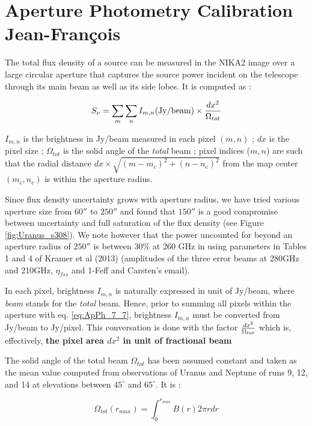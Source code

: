 \section{Aperture Photometry Calibration {\color{green} Jean-Fran\c cois}}

The total flux density of a source can be measured in the NIKA2 image over a large circular aperture that  
captures the source power incident on the telescope  through its main
beam as well as its side lobes. It is computed as :

\begin{equation}
S_{\nu} = \sum_{m} \sum_{n}  I_{m,n} ({\rm Jy/beam}) \times {dx^2 \over {\Omega_{tot}}}
\label{eq:ApPh_7_7}
\end{equation}

\noindent  $I_{m,n}$ is the brightness in Jy/beam measured in each pixel $(m,n)$  ; $dx$ is the pixel size ;
$\Omega_{tot}$ is the solid angle of the {\it total} beam ; pixel
indices ($m,n$) are such that the radial distance $dx \times \sqrt{(m-m_c)^2 + (n-n_c)^2}$ from the map center $(m_c,n_c)$
is within the aperture radius. 

Since flux density uncertainty grows with aperture radius, we have tried various aperture size from $60''$
to $250''$ and found that $150''$  is  a good compromise between  uncertainty and full saturation of the flux density (see Figure \ref{fig:Uranus_s308}). 
We note however that the power uncounted for beyond an aperture radius of $250''$ is between 30\% at 260 GHz 
in using parameters in Tables 1 and 4 of Kramer et al
(2013) (amplitudes of the three error beams at 280GHz and 210GHz, $\eta_{fss}$ and 1-Feff and Carsten's email).

In each pixel, brightness $I_{m,n}$ is naturally expressed in unit of
Jy/beam, where  {\it beam} stands for the {\it total} beam.
Hence, prior to summing all pixels within the aperture with eq. \ref{eq:ApPh_7_7}, brightness $I_{m,n}$
must be converted from  Jy/beam to Jy/pixel. This
conversation is done with the factor $dx^2 \over {\Omega_{tot}}$
which is, effectively, {\bf the pixel area $dx^2$  in unit of fractional beam}

The solid angle of the total beam $\Omega_{tot}$ has been assumed constant and taken as the mean value 
computed from observations of Uranus and Neptune of runs 9, 12, and 14 at elevations between $45^{\circ}$ and $65^{\circ}$. It is : 

\begin{equation}
 \Omega_{tot} (r_{max}) = \int_0^{r_{max}} B(r) 2 \pi r dr
\label{eq:Otrue}
\end{equation}

